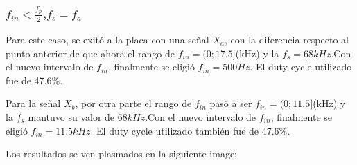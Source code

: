 \documentclass[../../ASSD_TP1_G7.tex]{subfiles}
\begin{document}
\subsubsection{$f_{in}<\frac{f_{p}}{2}$,$f_{s}=f_{a}$}

Para este caso, se exitó a la placa con una señal $X_{a}$, con la
diferencia respecto al punto anterior de que ahora el rango de $f_{in}=(0;17.5]$(kHz)
y la $f_{s}=68kHz.$Con el nuevo intervalo de $f_{in}$, finalmente
se eligió $f_{in}=500Hz.$ El duty cycle utilizado fue de 47.6\%.

Para la señal $X_{b}$, por otra parte el rango de $f_{in}$ pasó
a ser $f_{in}=(0;11.5]$(kHz) y la $f_{s}$ mantuvo su valor de $68kHz.$Con
el nuevo intervalo de $f_{in}$, finalmente se eligió $f_{in}=11.5kHz.$
El duty cycle utilizado también fue de 47.6\%.

Los resultados se ven plasmados en la siguiente image:
\end{document}
